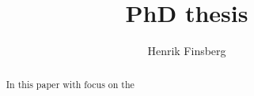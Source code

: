 \documentclass[a4paper,10pt]{article}
\title{PhD thesis}
\author{Henrik Finsberg}
\begin{document}
\maketitle

\begin{abstract}
In this paper with focus on the 
\end{abstract}










\end{document}
